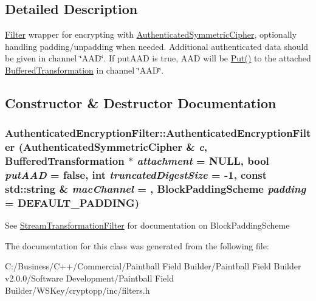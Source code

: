 \subsection{Detailed Description}
\hyperlink{class_filter}{Filter} wrapper for encrypting with \hyperlink{class_authenticated_symmetric_cipher}{AuthenticatedSymmetricCipher}, optionally handling padding/unpadding when needed. Additional authenticated data should be given in channel \char`\"{}AAD\char`\"{}. If putAAD is true, AAD will be \hyperlink{class_buffered_transformation_ae70658b0d271f8e114ac6c3cc9774ede}{Put()} to the attached \hyperlink{class_buffered_transformation}{BufferedTransformation} in channel \char`\"{}AAD\char`\"{}. 

\subsection{Constructor \& Destructor Documentation}
\hypertarget{class_authenticated_encryption_filter_ab50017b68574475d37fc726717fde546}{
\subsubsection[{AuthenticatedEncryptionFilter}]{\setlength{\rightskip}{0pt plus 5cm}AuthenticatedEncryptionFilter::AuthenticatedEncryptionFilter ({\bf AuthenticatedSymmetricCipher} \& {\em c}, \/  {\bf BufferedTransformation} $\ast$ {\em attachment} = {\ttfamily NULL}, \/  bool {\em putAAD} = {\ttfamily false}, \/  int {\em truncatedDigestSize} = {\ttfamily -\/1}, \/  const std::string \& {\em macChannel} = {}, \/  BlockPaddingScheme {\em padding} = {\ttfamily DEFAULT\_\-PADDING})}}
\label{class_authenticated_encryption_filter_ab50017b68574475d37fc726717fde546}
See \hyperlink{class_stream_transformation_filter}{StreamTransformationFilter} for documentation on BlockPaddingScheme 

The documentation for this class was generated from the following file:\begin{DoxyCompactItemize}
\item 
C:/Business/C++/Commercial/Paintball Field Builder/Paintball Field Builder v2.0.0/Software Development/Paintball Field Builder/WSKey/cryptopp/inc/filters.h\end{DoxyCompactItemize}
